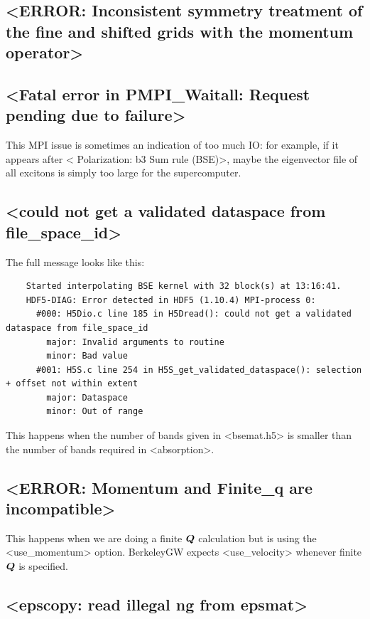 \documentclass[hyperref, a4paper, 12pt]{report}
\def\texttt#1{<#1>}%
\newcommand{\shortcode}[1]{\texttt{#1}}
\begin{document}
\subsection{\shortcode{ERROR: Inconsistent symmetry treatment of the fine and shifted grids with the momentum operator}}

\subsection{\shortcode{Fatal error in PMPI_Waitall: Request pending due to failure}}

This MPI issue is sometimes an indication of too much IO: 
for example, if it appears after \shortcode{ Polarization: b3 Sum rule (BSE)}, 
maybe the eigenvector file of all excitons 
is simply too large for the supercomputer. 

\subsection{\shortcode{could not get a validated dataspace from file_space_id}}

The full message looks like this: 
\begin{lstlisting}
    Started interpolating BSE kernel with 32 block(s) at 13:16:41.
    HDF5-DIAG: Error detected in HDF5 (1.10.4) MPI-process 0:
      #000: H5Dio.c line 185 in H5Dread(): could not get a validated dataspace from file_space_id
        major: Invalid arguments to routine
        minor: Bad value
      #001: H5S.c line 254 in H5S_get_validated_dataspace(): selection + offset not within extent
        major: Dataspace
        minor: Out of range
\end{lstlisting}
This happens when the number of bands given in \shortcode{bsemat.h5} 
is smaller than the number of bands required in \shortcode{absorption}.

\subsection{\shortcode{ERROR: Momentum and Finite_q are incompatible}}

This happens when we are doing a finite $\vb*{Q}$ calculation 
but is using the \shortcode{use_momentum} option.
BerkeleyGW expects \shortcode{use_velocity} 
whenever finite $\vb*{Q}$ is specified.

\subsection{\shortcode{epscopy: read illegal ng from epsmat}}
\end{document}
